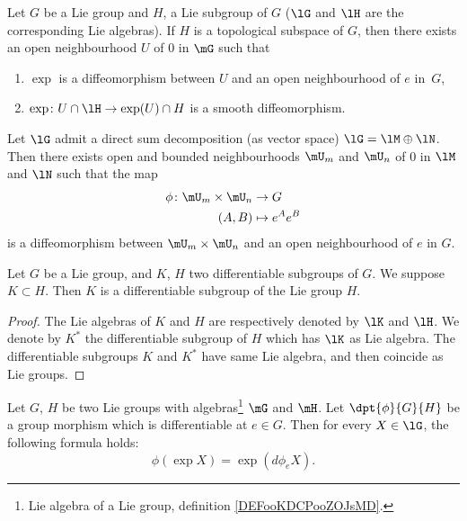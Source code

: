 \begin{lemma}       \label{LEMooOBIMooVvIDnb} 
 Let $G$ be a Lie group and $H$, a Lie subgroup of $G$ ($\lG$ and $\lH$ are the corresponding Lie algebras). If $H$ is a topological subspace of $G$, then there exists an open neighbourhood $U$ of $0$ in $\mG$ such that
 \begin{enumerate}
 \item $\exp$ is a diffeomorphism between $U$ and an open neighbourhood of $e$ in~$G$,
 \item
     \( \exp\colon U\cap\lH\to \exp(U)\cap H\) is a smooth diffeomorphism.
 \end{enumerate}
\end{lemma}
 

\begin{lemma}  \label{LEMooEBQUooKXkCda} 
Let $\lG$ admit a direct sum decomposition (as vector space) $\lG=\lM\oplus\lN$. Then there exists open and bounded neighbourhoods $\mU_m$ and $\mU_n$ of $0$ in $\lM$ and $\lN$ such that the map
		\begin{equation}
		\begin{aligned}
			\phi \colon \mU_m\times\mU_n &\to G\\
			(A,B)&\mapsto e^Ae^B
		\end{aligned}
	\end{equation}
is a diffeomorphism between $\mU_m\times\mU_n$ and an open neighbourhood of $e$ in $G$.
\end{lemma}


\begin{corollary}
Let $G$ be a Lie group, and $K$, $H$ two differentiable subgroups of $G$. We suppose $K\subset H$. Then $K$ is a differentiable subgroup of the Lie group $H$.
\end{corollary}

\begin{proof}
The Lie algebras of $K$ and $H$ are respectively denoted by $\lK$ and $\lH$. We denote by $K^*$ the differentiable subgroup of $H$ which has $\lK$ as Lie algebra. The differentiable subgroups $K$ and $K^*$ have same Lie algebra, and then coincide as Lie groups.
\end{proof}

\begin{lemma}		\label{lemsur5d}
    Let $G$, $H$ be two Lie groups with algebras\footnote{Lie algebra of a Lie group, definition \ref{DEFooKDCPooZOJsMD}.} $\mG$ and $\mH$. Let $\dpt{\phi}{G}{H}$ be a group morphism which is differentiable at $e\in G$. Then for every $X\in\lG$, the following formula holds:
    \begin{equation}
		\phi(\exp X)=\exp(d\phi_eX).
    \end{equation}
\end{lemma}

